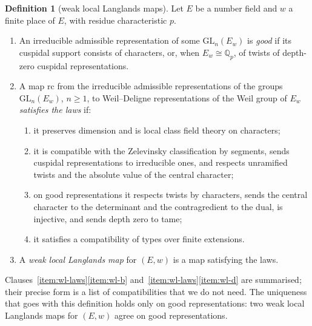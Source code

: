 \documentclass[11pt]{amsbook}
\theoremstyle{plain}
\theoremstyle{definition}
\newtheorem{definition}[theorem]{Definition}
\theoremstyle{remark}
\numberwithin{equation}{section}
\numberwithin{figure}{chapter}
\numberwithin{table}{chapter}
\newcommand{\Q}{\mathbb{Q}}
\begin{document}
\begin{definition}[weak local Langlands maps]\label{def:weak-llc}
Let $E$ be a number field and $w$ a finite place of $E$, with residue
characteristic $p$.
\begin{enumerate}[label=(\arabic*)]
\item An irreducible admissible representation of some
$\mathrm{GL}_n(E_w)$ is \emph{good} if its cuspidal support consists of
characters, or, when $E_w\cong\Q_p$, of twists of depth-zero cuspidal
representations.
\item\label{item:wl-laws} A map $\mathrm{rc}$ from the irreducible admissible
representations of the groups $\mathrm{GL}_n(E_w)$, $n\ge1$, to
Weil--Deligne representations of the Weil group of $E_w$
\emph{satisfies the laws} if:
\begin{enumerate}[label=(\alph*)]
\item\label{item:wl-a} it preserves dimension and is local class field theory on
characters;
\item\label{item:wl-b}
it is compatible with the Zelevinsky classification by segments,
sends cuspidal representations to irreducible ones, and respects
unramified twists and the absolute value of the central character;
\item on good representations it respects twists by characters, sends
the central character to the determinant and the contragredient to
the dual, is injective, and sends depth zero to tame;
\item\label{item:wl-d}
it satisfies a compatibility of types over finite extensions.
\end{enumerate}
\item A \emph{weak local Langlands map} for $(E,w)$ is a map satisfying
the laws.
\end{enumerate}
\end{definition}

\noindent Clauses~\ref{item:wl-laws}\ref{item:wl-b}
and~\ref{item:wl-laws}\ref{item:wl-d} are summarised; their precise form
is a list of compatibilities that we do not need. The uniqueness that
goes with this definition holds only on good representations: two weak
local Langlands maps for $(E,w)$ agree on good representations.
\end{document}
